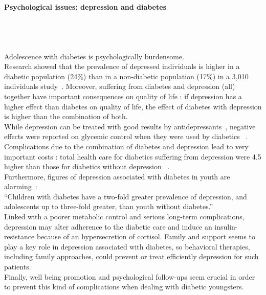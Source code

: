 \paragraph{Psychological issues: depression and diabetes}
\\
\\
\\
Adolescence with diabetes is psychologically burdensome. 
\\
Research showed that the prevalence of depressed individuals is higher in a diabetic population (24\%) than in a non-diabetic population (17\%) in a 3,010 individuals study~\cite{goldney2004diabetes}. Moreover, suffering from diabetes and depression (all) together have important consequences on quality of life : if depression has a higher effect than diabetes on quality of life, the effect of diabetes with depression is higher than the combination of both. 
\\
While depression can be treated with good results by antidepressants~\cite{Goodnick2000}, negative effects were reported on glycemic control when they were used by diabetics ~\cite{Lustman2002917}. Complications due to the combination of diabetes and depression lead to very important costs : total health care for diabetics suffering from depression were 4.5 higher than those for diabetics without depression ~\cite{egede2002comorbid}.
\\
Furthermore, figures of depression associated with diabetes in youth are alarming~\cite{Grey2002907}:\\
``Children with diabetes have a two-fold greater prevalence of depression, and adolescents up to three-fold greater, than youth without diabetes.''\\
Linked with a poorer metabolic control and serious long-term complications, depression may alter adherence to the diabetic care and induce an insulin-resistance because of an hypersecretion of cortisol. Family and support seems to play a key role in depression associated with diabetes, so behavioral therapies, including family approaches, could prevent or treat efficiently depression for such patients.
\\
Finally, well being promotion and psychological follow-ups seem crucial in order to prevent this kind of complications when dealing with diabetic youngsters.
\\


